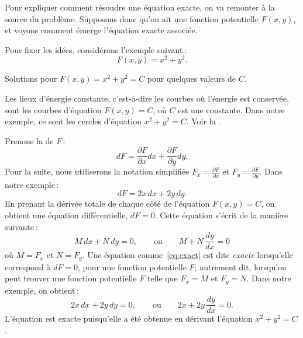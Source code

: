 Pour expliquer comment résoudre une équation exacte, on va remonter à la source du problème.  Supposons donc qu'on ait une fonction potentielle $F(x,y)$, et voyons comment émerge l'équation exacte associée.

Pour fixer les idées, considérons l'exemple suivant\,:
\begin{equation*}
F(x,y) = x^2+y^2 .
\end{equation*}

\begin{mywrapfig}[17]{3.25in}
\capstart
{}
\caption{Solutions pour $F(x,y) = x^2+y^2 = C$ pour quelques valeurs de 
$C$.\label{exact:circlesfig}}
\end{mywrapfig}
Les lieux d'énergie constante, c'est-à-dire les courbes où l'énergie est conservée, sont les courbes d'équation $F(x,y) = C$,
où $C$ est une constante.  Dans notre exemple, ce sont les cercles d'équation $x^2+y^2=C$.  Voir 
la~.

Prenons la 
\emph{} de
$F$\,:
\begin{equation*}
dF = \frac{\partial F}{\partial x} dx + \frac{\partial F}{\partial y} dy .
\end{equation*}
Pour la suite, nous utiliserons la notation simplifiée 
$F_x = \frac{\partial F}{\partial x}$ et
$F_y = \frac{\partial F}{\partial y}$.
Dans notre exemple\,: 
\begin{equation*}
dF = 2x \, dx + 2y \, dy .
\end{equation*}
En prenant la dérivée totale de chaque côté de l'équation $F(x,y) = C$, on obtient une équation différentielle, 
$dF = 0$.  Cette équation s'écrit de la manière suivante\,:
\begin{equation}\label{eq:exact}
M \, dx + N \, dy = 0, \qquad
\text{ou} \qquad
M + N \, \frac{dy}{dx} = 0 
\end{equation}
où $M=F_x$ et $N=F_y$.  Une équation comme~\eqref{eq:exact} est dite \emph{exacte} lorsqu'elle correspond à $dF = 0$, pour une fonction potentielle $F$; autrement dit, lorsqu'on peut trouver une fonction potentielle $F$ telle que $F_x=M$ et $F_y=N$.
Dans notre exemple, on obtient\,: 
\begin{equation*}
2x \, dx + 2y \, dy = 0, \qquad
\text{ou} \qquad
2x + 2y \, \frac{dy}{dx} = 0 .
\end{equation*}
L'équation est exacte puisqu'elle a été obtenue en dérivant l'équation $x^2+y^2=C$.

